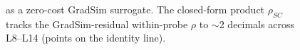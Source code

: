 \begin{figure}[t]
\centering

\caption{\SxC{} as a zero-cost GradSim surrogate. The closed-form product
$\rho_{SC}$ tracks the GradSim-residual within-probe $\rho$ to $\sim$2 decimals
across L8--L14 (points on the identity line).}
\label{fig:surrogate}
\end{figure}
